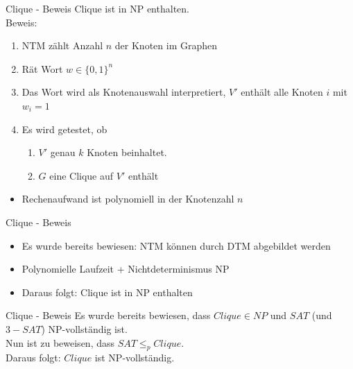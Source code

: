\documentclass[12pt,donthandout,notes=dontshow,xcolor=table]{beamer}
\begin{document}
\begin{frame}{Clique - Beweis}
Clique ist in NP enthalten.\\
Beweis:\\
\begin{enumerate}
\item NTM zählt Anzahl \(n\) der Knoten im Graphen
\pause
\item Rät Wort \(w \in \{0,1\}^n\)
\pause
\item Das Wort wird als Knotenauswahl interpretiert, \(V'\) enthält alle Knoten \(i\) mit \(w_i = 1\)
\pause
\item Es wird getestet, ob
\begin{enumerate}
\item \(V'\) genau \(k\) Knoten beinhaltet.
\item \(G\) eine Clique auf \(V'\) enthält
\end{enumerate}
\end{enumerate}
\pause
\begin{itemize}
\item Rechenaufwand ist polynomiell in der Knotenzahl \(n\)
\end{itemize}
\end{frame}

\begin{frame}{Clique - Beweis}
\begin{itemize}
\item Es wurde bereits bewiesen: NTM können durch DTM abgebildet werden
\item Polynomielle Laufzeit + Nichtdeterminismus \textrightarrow NP
\item Daraus folgt: Clique ist in NP enthalten
\end{itemize}
\end{frame}

\begin{frame}{Clique - Beweis}
Es wurde bereits bewiesen, dass \(Clique \in NP\) und \(SAT\) (und \(3-SAT\)) NP-vollständig ist.\\
Nun ist zu beweisen, dass \(SAT \leq_p Clique\).\\
Daraus folgt: \(Clique\) ist NP-vollständig.
\end{frame}
\end{document}
